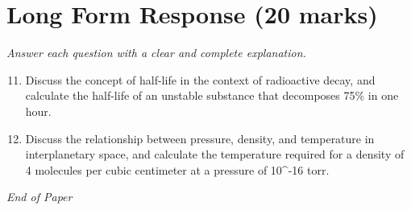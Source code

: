 \documentclass[12pt]{article}
\begin{document}
\section*{Long Form Response (20 marks)}
\textit{Answer each question with a clear and complete explanation.}
\begin{enumerate}[label=\arabic*.]
\setcounter{enumi}{10}
\item Discuss the concept of half-life in the context of radioactive decay, and calculate the half-life of an unstable substance that decomposes 75\% in one hour.
\item Discuss the relationship between pressure, density, and temperature in interplanetary space, and calculate the temperature required for a density of 4 molecules per cubic centimeter at a pressure of 10^-16 torr.
\end{enumerate}

\vfill
\noindent\textit{End of Paper}
\end{document}
